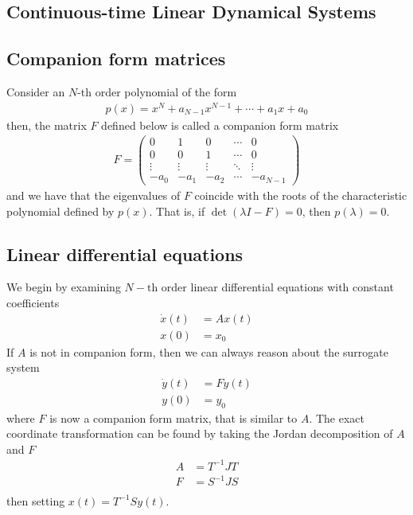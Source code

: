 \documentclass[a4paper,11pt]{exam}
\newcounter{ct}
\begin{document}
\begin{questions}
\section{Continuous-time Linear Dynamical Systems}
\subsection{Companion form matrices}
Consider an $N\text{-th}$ order polynomial of the form
\begin{align}
    p(x) = x^N + a_{N-1} x^{N-1} + \cdots + a_1 x + a_0
\end{align}
then, the matrix $F$ defined below is called a companion form matrix
\begin{align}
    F = \begin{pmatrix} 0 & 1 & 0 & \cdots & 0\\
                        0 & 0 & 1 & \cdots & 0\\
                        \vdots & \vdots & \vdots & \ddots & \vdots\\
                        -a_0 & -a_1 & -a_2 & \cdots & -a_{N-1}\end{pmatrix}
\end{align}
and we have that the eigenvalues of $F$ coincide with the roots of the characteristic polynomial defined by $p(x)$.  That is, if $\det(\lambda I - F) = 0$, then $p(\lambda) = 0$.  
\subsection{Linear differential equations}
We begin by examining $N-\text{th}$ order linear differential equations with constant coefficients
\begin{align}
    \dot{x}(t) &= A x(t)\\
    x(0) &= x_0
\end{align}
If $A$ is not in companion form, then we can always reason about the surrogate system
\begin{align}
    \dot{y}(t) &= F y(t)\\
    y(0) &= y_0
\end{align}
where $F$ is now a companion form matrix, that is similar to $A$.  The exact coordinate transformation can be found by taking the Jordan decomposition of $A$ and $F$
\begin{align}
    A &= T^{-1} J T\\
    F &= S^{-1} J S\\
\end{align}
then setting $x(t) = T^{-1} S y(t)$.

\end{questions}
\end{document}
